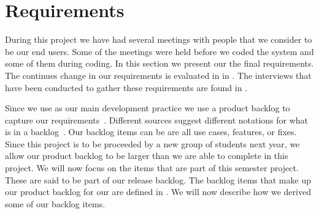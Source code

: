 \section{Requirements}
\label{sec:requirements}
During this project we have had several meetings with people that we consider to be our end users.
Some of the meetings were held before we coded the system and some of them during coding.
In this section we present our the final requirements.
The continues change in our requirements is evaluated in  in .
The interviews that have been conducted to gather these requirements are found in .

Since we use \scrum{} as our main development practice we use a product backlog to capture our requirements~\cite[p.~114]{Larman04}.
Different sources suggest different notations for what is in a backlog~\cite[p.~17]{scrumchecklist}\cite[pp.~123-124]{Larman04}.
Our backlog items can be are all use cases, features, or fixes.
Since this project is to be proceeded by a new group of students next year, we allow our product backlog to be larger than we are able to complete in this project.
We will now focus on the items that are part of this semester project.
These are said to be part of our release backlog.
The backlog items that make up our product backlog for our \subsystem{} are defined in .
We will now describe how we derived some of our backlog items.

